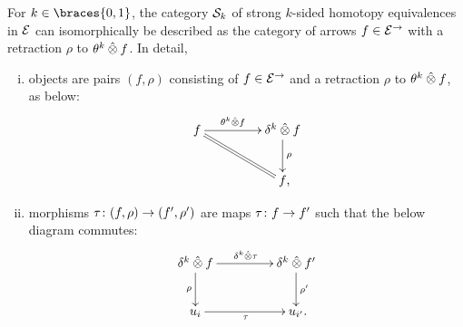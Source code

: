 \documentclass[reqno,10pt,a4paper,oneside,draft]{amsart}
\begin{document}
\begin{lemma} \label{strong-h-equiv-as-section}
For $k \in \braces{0, 1}$, the category $\cal{S}_k$ of strong $k$-sided homotopy equivalences in $\catE$ can isomorphically be described as the category of arrows $f \in \catE^{\to}$ with a retraction $\rho$ to $\thetak \hatotimes f$.
In detail,
\begin{enumerate}[(i)]
\item objects are pairs $(f, \rho)$ consisting of $f \in \catE^\to$ and a retraction $\rho$ to $\thetak \hatotimes f$, as below:
\[
\xymatrix@C+2em{
  f
  \ar[r]^-{\thetak \hatotimes f}
  \ar@{=}[dr]
&
  \kcyl \hatotimes f \ar[d]^{\rho}
\\&
  f
\rlap{,}}
\]
\item morphisms $\tau \co (f, \rho) \to (f', \rho')$ are maps $\tau \co f \to f'$ such that the below diagram commutes:
\[
\xymatrix@C+2em{
  \kcyl \hatotimes f
  \ar[d]_-{\rho}
  \ar[r]^{\kcyl \hatotimes \tau}
&
 \kcyl \hatotimes f'
  \ar[d]^-{\rho'}
\\
  u_i
  \ar[r]_{\tau}
&
  u_{i'}
\rlap{.}}
\]
\end{enumerate}
\end{lemma}
\end{document}
